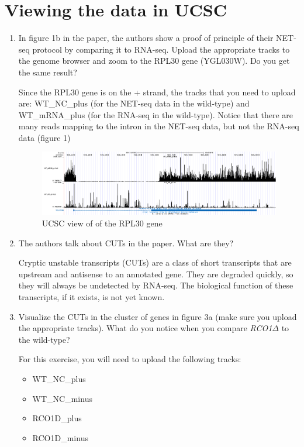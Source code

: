 \documentclass[a4paper,11pt]{article}
\begin{document}
\section{Viewing the data in UCSC}
\begin{enumerate}
\item In figure 1b in the paper, the authors show a proof of principle of their NET-seq protocol by comparing it to RNA-seq. Upload the appropriate tracks to the genome browser and zoom to the RPL30 gene (YGL030W). Do you get the same result?

Since the RPL30 gene is on the + strand, the tracks that you need to upload are: WT\_NC\_plus (for the NET-seq data in the wild-type) and WT\_mRNA\_plus (for the RNA-seq in the wild-type). Notice that there are many reads mapping to the intron in the NET-seq data, but not the RNA-seq data (figure 1)

\begin{figure}[h]
\begin{center}
\includegraphics[width=1\textwidth]{solution-figure1-Q3-1.png}
\caption{UCSC view of of the RPL30 gene}
\label{fig:HMM}
\end{center}
\end{figure}

\item The authors talk about CUTs in the paper. What are they?

Cryptic unstable transcripts (CUTs) are a class of short transcripts that are upstream and antisense to an annotated gene. They are degraded quickly, so they will always be undetected by RNA-seq. The biological function of these transcripts, if it exists, is not yet known.

\item Visualize the CUTs in the cluster of genes in figure 3a (make sure you upload the appropriate tracks). What do you notice when you compare \textit{RCO1$\Delta$} to the wild-type?

For this exercise, you will need to upload the following tracks:
\begin{itemize}
\item WT\_NC\_plus
\item WT\_NC\_minus
\item RCO1D\_plus
\item RCO1D\_minus
\end{itemize}


\end{enumerate}
\end{document}
